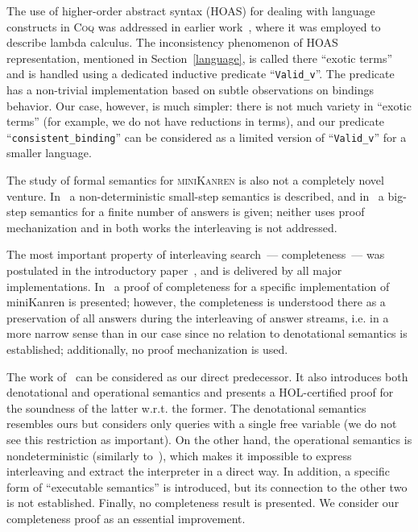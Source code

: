 The use of higher-order abstract syntax (HOAS) for dealing with language constructs in \textsc{Coq} was addressed in earlier work~\cite{HOASinCoq},
where it was employed to describe lambda calculus. The inconsistency phenomenon of HOAS representation, mentioned in Section~\ref{language}, is called
there ``exotic terms'' and is handled using a dedicated inductive predicate ``\lstinline|Valid_v|''. The predicate has a non-trivial implementation based
on subtle observations on bindings behavior. Our case, however, is much simpler: there is not much variety in ``exotic terms'' (for example, we do not have
reductions in terms), and our predicate ``\lstinline|consistent_binding|'' can be considered as a limited version of ``\lstinline|Valid_v|'' for a
smaller language.

The study of formal semantics for \textsc{miniKanren} is also not a completely novel venture. In~\cite{RelConversion} a non-deterministic
small-step semantics is described, and in~\cite{DivTest} a big-step semantics for a finite number of answers is given;
neither uses proof mechanization and in both works the interleaving is not addressed. 

The most important property of interleaving search~--- completeness~--- was postulated in the introductory paper~\cite{Search}, and is delivered by
all major implementations. In~\cite{2016} a proof of completeness for a specific implementation of miniKanren is presented; however, the completeness is understood there as a
preservation of all answers during the interleaving of answer streams, i.e. in a more narrow sense than in our case since no relation
to denotational semantics is established{\color{red}; additionally, no proof mechanization is used.}

The work of~\cite{MechanisingMiniKanren} can be considered as our direct predecessor. It also introduces both denotational and
operational semantics and presents a \textsc{HOL}-certified proof for the soundness of the latter w.r.t. the former. The denotational
semantics resembles ours but considers only queries with a single free variable (we do not see this restriction as important).
On the other hand, the operational semantics is nondeterministic (similarly to~\cite{RelConversion}), which makes it
impossible to express interleaving and extract the interpreter in a direct way. In addition, a specific form of ``executable semantics''
is introduced, but its connection to the other two is not established. Finally, no completeness result is presented.
We consider our completeness proof as an essential improvement. 
